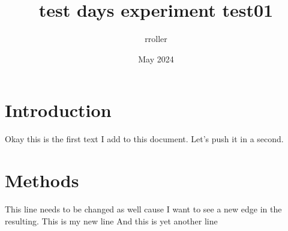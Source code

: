 \documentclass{article}
\title{test days experiment test01}
\author{rroller }
\date{May 2024}
\begin{document}
\maketitle

\section{Introduction}
Okay this is the first text I add to this document. Let's push it in a second.


\section{Methods}
This line needs to be changed as well cause I want to see a new edge in the resulting.
This is my new line
And this is yet another line
\end{document}
